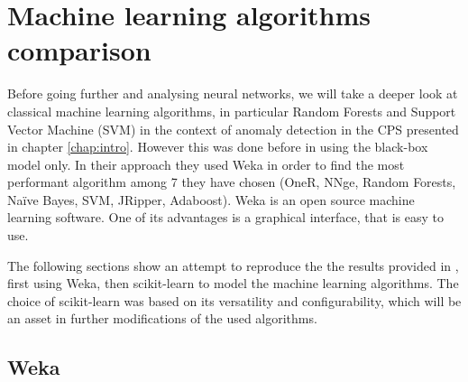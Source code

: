\chapter{Machine learning algorithms comparison} \label{chap:methods}

Before going further and analysing neural networks, we will take a deeper look at classical machine learning algorithms, in particular Random Forests and Support Vector Machine (SVM) in the context of anomaly detection in the CPS presented in chapter \ref{chap:intro}. However this was done before in \cite{borges_hink_machine_2014-1} using the black-box model only. In their approach they used Weka \cite{witten_appendix_2017} in order to find the most performant algorithm among 7 they have chosen (OneR, NNge, Random Forests, Naïve Bayes, SVM, JRipper, Adaboost). Weka is an open source machine learning software. One of its advantages is a graphical interface, that is easy to use. 

The following sections show an attempt to reproduce the the results provided in \cite{borges_hink_machine_2014-1}, first using Weka, then scikit-learn \cite{pedregosa_scikit-learn_2011} to model the machine learning algorithms. The choice of scikit-learn was based on its versatility and configurability, which will be an asset in further modifications of the used algorithms.

\section{Weka} \label{sec:weka_in_chap:methods}

